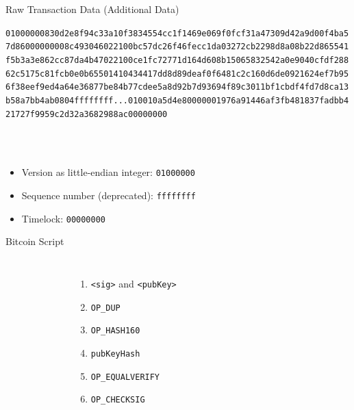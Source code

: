 \documentclass[]{beamer}
\begin{document}
\begin{frame}{Raw Transaction Data (Additional Data)}
\begin{scriptsize}
\texttt{\alert<2>{01000000}\textcolor{black!30}{830d2e8f94c33a10f3834554cc1f1469e069f0fcf31a47309d42a9d00f4ba5
7d86000000008c493046022100bc57dc26f46fecc1da03272cb2298d8a08b22d865541
f5b3a3e862cc87da4b47022100ce1fc72771d164d608b15065832542a0e9040cfdf288
62c5175c81fcb0e0b65501410434417dd8d89deaf0f6481c2c160d6de0921624ef7b95
6f38eef9ed4a64e36877be84b77cdee5a8d92b7d93694f89c3011bf1cbdf4fd7d8ca13
b58a7bb4ab0804}\alert<3>{ffffffff}...\textcolor{black!30}{010010a5d4e80000001976a91446af3fb481837fadbb4
21727f9959c2d32a3682988ac}\alert<4>{00000000}}
\end{scriptsize}
\vspace{1em}
\scriptsize \\
\\
\begin{itemize}
	\item \alert<2>{Version as little-endian integer: \texttt{01000000}}
	\item \alert<3>{Sequence number (deprecated): \texttt{ffffffff}}
	\item \alert<4>{Timelock: \texttt{00000000}}
\end{itemize}
\end{frame}


\begin{frame}{Bitcoin Script}
\begin{columns}
\begin{figure}
	
\end{figure}
\begin{enumerate}
\item<1-> \texttt{<sig>} and \texttt{<pubKey>}
\item<2-> \texttt{OP\_DUP}
\item<6-> \texttt{OP\_HASH160}
\item<10-> \texttt{pubKeyHash}
\item<11-> \texttt{OP\_EQUALVERIFY}
\item<14-> \texttt{OP\_CHECKSIG}
\end{enumerate}
\end{columns}
\end{frame}
\end{document}
